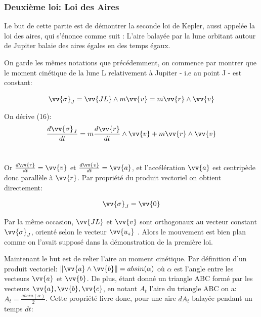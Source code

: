 \documentclass{aa}
\begin{document}
\subsubsection{Deuxième loi: Loi des Aires}

 Le but de cette partie est de démontrer la seconde loi de Kepler, aussi appelée la loi des aires, qui s'énonce comme suit : L'aire balayée par la lune orbitant autour de Jupiter balaie des aires égales en des temps égaux. \break

On garde les mêmes notations que précédemment, on commence par montrer que le moment cinétique de la lune L relativement à Jupiter - i.e au point J - est constant:
    
\begin{equation}
     \vv{\sigma}_J = \vv{JL} \wedge m\vv{v} = m\vv{r} \wedge \vv{v}
\end{equation}

\begin{flushleft}
    On dérive (16): \\
    \begin{equation}
        \frac{d\vv{\sigma}_J}{dt} = m\frac{d\vv{r}}{dt} \wedge \vv{v} + m\vv{r} \wedge \vv{v} 
    \end{equation} \\
\end{flushleft} 


Or \large{ $\frac{d\vv{r}}{dt} = \vv{v}$} et \large{$\frac{d\vv{v}}{dt} = \vv{a}$}, et l'accélération $\vv{a}$ est centripède donc parallèle à $\vv{r}$. Par propriété du produit vectoriel on obtient directement: 


\begin{gather}
\vv{\sigma}_J = \vv{0}
\end{gather}


Par la même occasion, $\vv{JL}$ et $\vv{v}$ sont orthogonaux au vecteur constant $\vv{\sigma}_J$, orienté selon le vecteur $\vv{u_z}$ . Alors le mouvement est bien plan comme on l'avait supposé dans la démonstration de la première loi.\break

Maintenant le but est de relier l'aire au moment cinétique. Par définition d'un produit vectoriel:
$\| \vv{a} \wedge \vv{b} \| = absin(\alpha)$ où $\alpha$ est l'angle entre les vecteurs $\vv{a}$ et $\vv{b}$. De plus, étant donné un triangle ABC formé par les vecteurs $\vv{a},\vv{b},\vv{c}$, en notant $A_t$ l'aire du triangle ABC on a: \large{$A_t = \frac{absin(\alpha)}{2}$}. Cette propriété livre donc, pour une aire $dA_t$ balayée pendant un temps $dt$:
\end{document}
